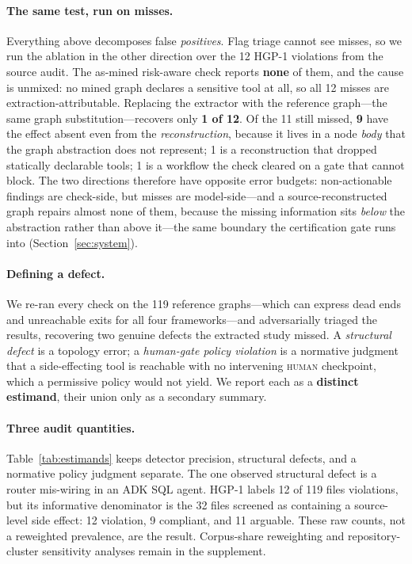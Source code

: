 \paragraph{The same test, run on misses.}
Everything above decomposes false \emph{positives}. Flag triage cannot see
misses, so we run the ablation in the other direction over the 12 HGP-1
violations from the source audit. The as-mined risk-aware check reports
\textbf{none} of them,
and the cause is unmixed: no mined graph declares a sensitive tool at all, so
all 12 misses are extraction-attributable. Replacing the extractor
with the reference graph---the same graph substitution---recovers only
\textbf{1 of 12}. Of the 11 still missed, \textbf{9} have the effect absent even
from the \emph{reconstruction}, because it lives in a node \emph{body} that the
graph abstraction does not represent; 1 is a reconstruction that dropped
statically declarable tools; 1 is a workflow the check cleared on a gate that
cannot block. The two directions therefore have opposite error budgets:
non-actionable findings are check-side, but misses are model-side---and a
source-reconstructed graph repairs almost none of them, because the missing information
sits \emph{below} the abstraction rather than above it---the same boundary the
certification gate runs into (Section~\ref{sec:system}).


\paragraph{Defining a defect.}
We re-ran every check on the 119 reference graphs---which can express dead ends
and unreachable exits for all four frameworks---and adversarially triaged the
results, recovering two genuine defects the extracted study missed. A
\emph{structural defect} is a topology error; a \emph{human-gate policy
violation} is a normative judgment that a
side-effecting tool is reachable with no intervening \textsc{human} checkpoint,
which a permissive policy would not yield. We report each as a \textbf{distinct
estimand}, their union only as a secondary summary.

\paragraph{Three audit quantities.}
Table~\ref{tab:estimands} keeps detector precision, structural defects, and a
normative policy judgment separate. The one observed structural defect is a
router mis-wiring in an ADK SQL agent. HGP-1 labels 12 of 119 files violations,
but its informative denominator is the 32 files screened as containing a
source-level side effect: 12 violation, 9 compliant, and 11 arguable. These raw
counts, not a reweighted prevalence, are the result. Corpus-share reweighting
and repository-cluster sensitivity analyses remain in the supplement.

